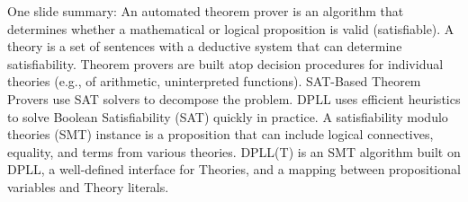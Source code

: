 \documentclass[11pt]{article}
\begin{document}
One slide summary: An automated theorem prover is an algorithm that determines whether a mathematical or logical proposition is valid (satisfiable). A theory is a set of sentences with a deductive system that can determine satisfiability. 
Theorem provers are built atop decision procedures for individual theories (e.g., of arithmetic, uninterpreted functions). 
SAT-Based Theorem Provers use SAT solvers to decompose the problem. DPLL uses efficient heuristics to solve Boolean Satisfiability (SAT) quickly in practice.
A satisfiability modulo theories (SMT) instance is a proposition that can include logical connectives, equality, and terms from various theories. DPLL(T) is an SMT algorithm built on DPLL, a well-defined interface for Theories, and a mapping between propositional variables and Theory literals.


\fi
\end{document}
